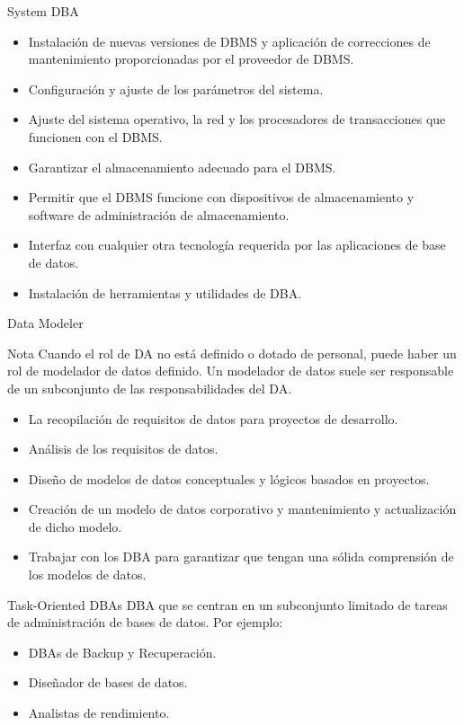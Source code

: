 \documentclass{beamer}
\begin{document}
\begin{frame}{System DBA}
    \begin{itemize}
        \item Instalación de nuevas versiones de DBMS y aplicación de correcciones de mantenimiento proporcionadas por el proveedor de DBMS.
        \item Configuración y ajuste de los parámetros del sistema.
        \item Ajuste del sistema operativo, la red y los procesadores de transacciones que funcionen con el DBMS.
        \item Garantizar el almacenamiento adecuado para el DBMS.
        \item Permitir que el DBMS funcione con dispositivos de almacenamiento y software de administración de almacenamiento.
        \item Interfaz con cualquier otra tecnología requerida por las aplicaciones de base de datos.
        \item Instalación de herramientas y utilidades de DBA.
    \end{itemize}
\end{frame}

\begin{frame}{Data Modeler}
    \begin{alertblock}{Nota}
        Cuando el rol de DA no está definido o dotado de personal, puede haber un rol de modelador de datos definido. Un modelador de datos suele ser responsable de un subconjunto de las responsabilidades del DA.
    \end{alertblock}
    \begin{itemize}
        \item La recopilación de requisitos de datos para proyectos de desarrollo.
        \item Análisis de los requisitos de datos.
        \item Diseño de modelos de datos conceptuales y lógicos basados en proyectos.
        \item Creación de un modelo de datos corporativo y mantenimiento y actualización de dicho modelo.
        \item Trabajar con los DBA para garantizar que tengan una sólida comprensión de los modelos de datos.
    \end{itemize}
\end{frame}

\begin{frame}{Task-Oriented DBAs}
    DBA que se centran en un subconjunto limitado de tareas de administración de bases de datos.  Por ejemplo:
    \begin{itemize}
        \item DBAs de Backup y Recuperación.
        \item Diseñador de bases de datos.
        \item Analistas de rendimiento.
    \end{itemize}
\end{frame}
\end{document}
